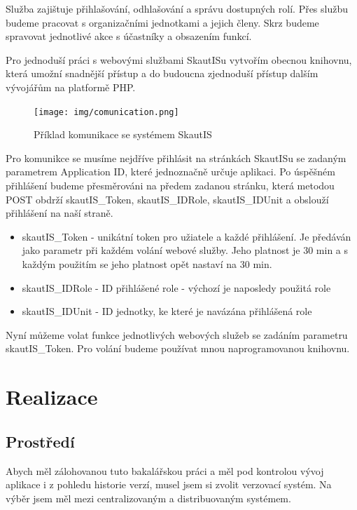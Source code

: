 \documentclass[thesis=B,czech]{FITthesis}[2011/06/14]
\begin{document}
Služba  zajištuje přihlašování, odhlašování a správu dostupných rolí. Přes službu  budeme pracovat s organizačními jednotkami a jejich členy. Skrz  budeme spravovat jednotlivé akce s účastníky a obsazením funkcí.

Pro jednoduší práci s webovými službami SkautISu vytvořím obecnou knihovnu, která umožní snadnější přístup a do budoucna zjednoduší přístup dalším vývojářům na platformě PHP.

\begin{figure}[h] \centering
 	\texttt{[image: img/comunication.png]}
 	\caption[SkautIS]{Příklad komunikace se systémem SkautIS}\label{fig:comunication-diagram}
\end{figure}

Pro komunikce se musíme nejdříve přihlásit na stránkách SkautISu se zadaným parametrem Application ID, které jednoznačně určuje aplikaci. Po úspěšném přihlášení budeme přesměrováni na předem zadanou stránku, která metodou POST obdrží skautIS\_Token, skautIS\_IDRole, skautIS\_IDUnit a obslouží přihlášení na naší straně.

\begin{itemize}
	\item skautIS\_Token - unikátní token pro užiatele a každé přihlášení. Je předáván jako parametr při každém volání webové služby. Jeho platnost je 30 min a s každým použitím se jeho platnost opět nastaví na 30 min. 
	\item skautIS\_IDRole - ID přihlášené role - výchozí je naposledy použitá role 
	\item skautIS\_IDUnit - ID jednotky, ke které je navázána přihlášená role 
\end{itemize}

Nyní můžeme volat funkce jednotlivých webových služeb se zadáním parametru skautIS\_Token. Pro volání budeme používat mnou naprogramovanou knihovnu. 

\chapter{Realizace}

\section{Prostředí}
Abych měl zálohovanou tuto bakalářskou práci a měl pod kontrolou vývoj aplikace i z pohledu historie verzí, musel jsem si zvolit verzovací systém. Na výběr jsem měl mezi centralizovaným a distribuovaným systémem.
\end{document}
